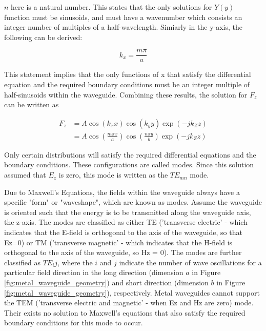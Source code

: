 \documentclass[a4paper,12pt]{report}
\begin{document}
$n$ here is a natural number.
This states that the only solutions for $Y(y)$ function must be sinusoids,
and must have a wavenumber
which consists an integer number of multiples of a half-wavelength.
Simiarly in the y-axis, the following can be derived:

\begin{equation} \label{eq:wavenumber_x}
  k_x = \frac{m\pi}{a}
\end{equation}

This statement implies that the only functions of x that satisfy
the differential equation and the required boundary conditions
must be an integer multiple of half-sinusoids within the waveguide.
Combining these results, the solution for $F_z$ can be written as

\begin{equation}
  \begin{split}
    F_z &= A \cos(k_x x)\cos(k_y y)\exp(-j k_Z z) \\
        & = A \cos(\frac{m\pi x}{a}) \cos(\frac{n \pi y}{b})\exp(-j k_Z z)
  \end{split}
\end{equation}

Only certain distributions will satisfy the required differential equations
and the boundary conditions. These configurations are called modes.
Since this solution assumed that $E_z$ is zero, this mode is written as the $TE_{mn}$ mode.

Due to Maxwell's Equations,
the fields within the waveguide always have a specific "form" or "waveshape",
which are known as modes.
Assume the waveguide is oriented such that the energy is to be transmitted along the waveguide axis, the z-axis.
The modes are classified as either TE
('transverse electric' - which indicates that the E-field is orthogonal to the axis of the waveguide, so that Ez=0)
or TM ('transverse magnetic' - which indicates that the H-field is orthogonal to the axis of the waveguide, so Hz = 0).
The modes are further classified as $TE_ij$,
where the $i$ and $j$ indicate the number of wave oscillations for a particular
field direction in the long direction (dimension $a$ in Figure \ref{fig:metal_waveguide_geometry})
and short direction (dimension $b$ in Figure \ref{fig:metal_waveguide_geometry}), respectively.
Metal waveguides cannot support the TEM
('transverse electric and magnetic' - when Ez and Hz are zero) mode.
Their exists no solution to Maxwell's equations
that also satisfy the required boundary conditions for this mode to occur.
\end{document}
